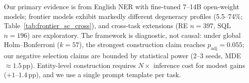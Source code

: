 Our primary evidence is from English NER with fine-tuned 7--14B open-weight models; frontier models exhibit markedly different degeneracy profiles (5.5--74\%; Table~\ref{tab:frontier_sc_cross}), and cross-task extensions (RE $n{=}397$, SQL $n{=}196$) are exploratory.
The framework is diagnostic, not causal: under global Holm--Bonferroni ($k{=}57$), the strongest construction claim reaches $p_{\text{adj}}{=}0.055$; our negative selection claims are bounded by statistical power (2--3 seeds, MDE ${\approx}1.5$\,pp).
Entity-level construction requires $N{\times}$ inference cost for modest gains ($+1$--$1.4$\,pp), and we use a single prompt template per task.
